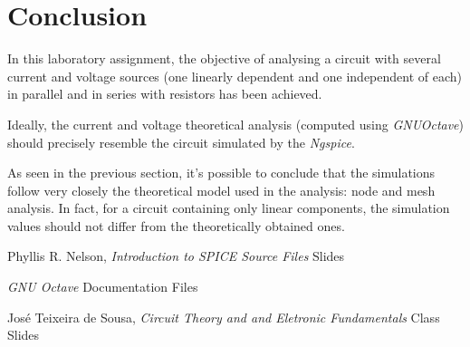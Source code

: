 \section{Conclusion}
\label{sec:conclusion}



In this laboratory assignment, the objective of analysing a circuit with several current and voltage sources (one linearly dependent and one independent of each) in parallel and in series with resistors has been
achieved.

Ideally, the current and voltage theoretical analysis (computed using \textit{GNUOctave}) should precisely resemble the circuit simulated by the \textit{Ngspice}. 

As seen in the previous section, it's possible to conclude that the simulations follow very closely the theoretical model used in the analysis: node and mesh analysis. In fact, for a circuit containing only linear components, the simulation values should not differ from the theoretically obtained ones.



\begin{thebibliography}{}

Phyllis R. Nelson, \emph{Introduction to SPICE Source Files} Slides

\emph{GNU Octave} Documentation Files 

José Teixeira de Sousa, \emph{Circuit Theory and and Eletronic Fundamentals} Class Slides

\end{thebibliography}